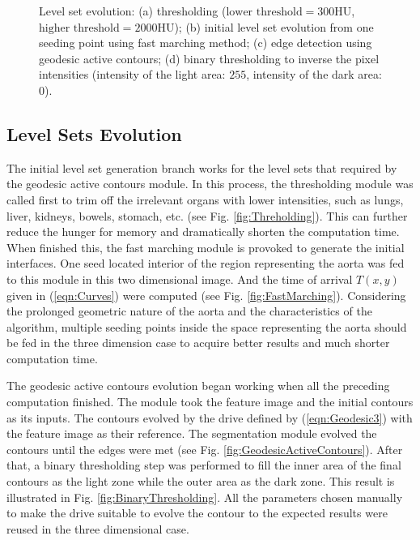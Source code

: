 \begin{figure}[t]
{\label{fig:BinaryThresholding}}
\caption{Level set evolution: (a) thresholding ($\text{lower threshold} = 300\text{HU}$, $\text{higher threshold} = 2000\text{HU}$); (b) initial level set evolution from one seeding point using fast marching method; (c) edge detection using geodesic active contours; (d) binary thresholding to inverse the pixel intensities (intensity of the light area: $255$, intensity of the dark area: $0$).}
\label{fig:LevelSetEvolution}
\end{figure}

\subsection{Level Sets Evolution}
The initial level set generation branch works for the level sets that required by the geodesic active contours module.
In this process, the thresholding module was called first to trim off the irrelevant organs with lower intensities, such as lungs, liver, kidneys, bowels, stomach, etc. (see Fig. \ref{fig:Threholding}).
This can further reduce the hunger for memory and dramatically shorten the computation time.
When finished this, the fast marching module is provoked to generate the initial interfaces.
One seed located interior of the region representing the aorta was fed to this module in this two dimensional image.
And the time of arrival $T(x,y)$ given in (\ref{eqn:Curves}) were computed (see Fig. \ref{fig:FastMarching}).
Considering the prolonged geometric nature of the aorta and the characteristics of the algorithm, multiple seeding points inside the space representing the aorta should be fed in the three dimension case to acquire better results and much shorter computation time.

The geodesic active contours evolution began working when all the preceding computation finished.
The module took the feature image and the initial contours as its inputs.
The contours evolved by the drive defined by (\ref{eqn:Geodesic3}) with the feature image as their reference.
The segmentation module evolved the contours until the edges were met (see Fig. \ref{fig:GeodesicActiveContours}).
After that, a binary thresholding step was performed to fill the inner area of the final contours as the light zone while the outer area as the dark zone.
This result is illustrated in Fig. \ref{fig:BinaryThresholding}.
All the parameters chosen manually to make the drive suitable to evolve the contour to the expected results were reused in the three dimensional case.

